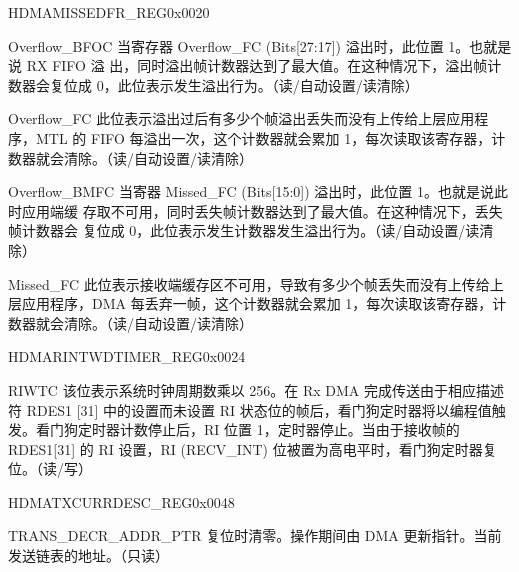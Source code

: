 \begin{register}{H}{DMAMISSEDFR\_REG}{0x0020}\label{regdesc:DMAMISSEDFRREG}
%
%
%
%
%
\regnewline%
\begin{regdesc}\begin{reglist}
\item [Overflow\_BFOC] 当寄存器 Overflow\_FC (Bits[27:17]) 溢出时，此位置 1。也就是说 RX FIFO 溢 出，同时溢出帧计数器达到了最大值。在这种情况下，溢出帧计数器会复位成 0，此位表示发生溢出行为。（读/自动设置/读清除）
\item [Overflow\_FC] 此位表示溢出过后有多少个帧溢出丢失而没有上传给上层应用程序，MTL 的 FIFO 每溢出一次，这个计数器就会累加 1，每次读取该寄存器，计数器就会清除。（读/自动设置/读清除）
\item [Overflow\_BMFC] 当寄器 Missed\_FC (Bits[15:0]) 溢出时，此位置 1。也就是说此时应用端缓 存取不可用，同时丢失帧计数器达到了最大值。在这种情况下，丢失帧计数器会 复位成 0，此位表示发生计数器发生溢出行为。（读/自动设置/读清除）
\item [Missed\_FC] 此位表示接收端缓存区不可用，导致有多少个帧丢失而没有上传给上层应用程序，DMA 每丢弃一帧，这个计数器就会累加 1，每次读取该寄存器，计数器就会清除。（读/自动设置/读清除）
\end{reglist}\end{regdesc}
\end{register}

\begin{register}{H}{DMARINTWDTIMER\_REG}{0x0024}\label{regdesc:DMARINTWDTIMERREG}
%
%
\regnewline%
\begin{regdesc}\begin{reglist}
\item [RIWTC]该位表示系统时钟周期数乘以 256。在 Rx DMA 完成传送由于相应描述符 RDES1 [31] 中的设置而未设置 RI 状态位的帧后，看门狗定时器将以编程值触发。看门狗定时器计数停止后，RI 位置  1，定时器停止。当由于接收帧的 RDES1[31] 的 RI 设置，RI (RECV\_INT) 位被置为高电平时，看门狗定时器复位。（读/写）
\end{reglist}\end{regdesc}
\end{register}


\begin{register}{H}{DMATXCURRDESC\_REG}{0x0048}\label{regdesc:DMATXCURRDESCREG}
%
\regnewline%
\begin{regdesc}\begin{reglist}
\item [TRANS\_DECR\_ADDR\_PTR]复位时清零。操作期间由 DMA 更新指针。当前发送链表的地址。（只读）
\end{reglist}\end{regdesc}
\end{register}


